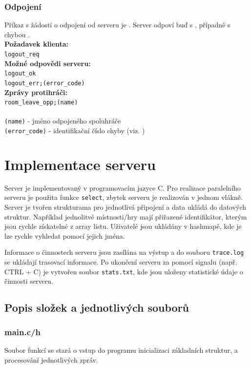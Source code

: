 \documentclass[12pt, a4paper]{article} %
\begin{document}
	\subsubsection{Odpojení}
	\par Příkaz s žádostí o odpojení od serveru je . Server odpoví buď s , případně s chybou .\\
	\textbf{Požadavek klienta:}\\
	\texttt{logout\_req}\\
	\textbf{Možné odpovědi serveru:}\\
	\texttt{logout\_ok}\\
	\texttt{logout\_err;(error\_code)}\\
	\textbf{Zprávy protihráči:}\\
	\texttt{room\_leave\_opp;(name)}\\\\
	\texttt{(name)} - jméno odpojeného spoluhráče\\
	\texttt{(error\_code)} - identifikační číslo chyby (viz. )
	
	\section{Implementace serveru}
	\par Server je implementovaný v programovacím jazyce C. Pro realizace paralelního serveru je použita funkce \texttt{select}, zbytek serveru je realizován v jednom vlákně. Server je tvořen strukturama pro jednotlivá připojení a data ukládá do datových struktur. Například jednolitvé místnosti/hry mají přiřazené identifikátor, kterým jsou rychle získatelné z array listu. Uživatelé jsou ukládány v hashmapě, kde je lze rychle vyhledat pomocí jejich jména.
	
	\par Informace o činnostech serveru jsou zasílána na výstup a do souboru \texttt{trace.log} se ukládají trasovací informace. Po ukončení serveru za pomocí signalu (např. CTRL + C) je vytvořen soubor \texttt{stats.txt}, kde jsou uloženy statistické údaje o činnosti serveru.

	\subsection{Popis složek a jednotlivých souborů}
	\subsubsection{main.c/h}
	\par Soubor funkcí se stará o vstup do programu inicializaci základních struktur, a procesování jednotlivých zpráv.
\end{document}
